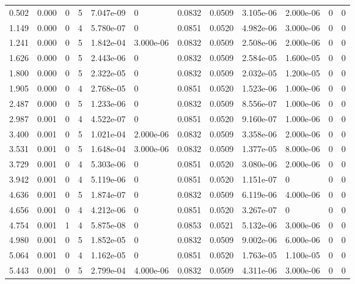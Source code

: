 \documentclass[preview]{standalone}
\begin{document}
{{\begin{tabular}{L{1.2cm}C{1.2cm} C{0.3cm}C{0.5cm} C{1.4cm}C{1.4cm} C{1.4cm}C{1.4cm} C{1.6cm}C{1.6cm} C{1.6cm}C{1.6cm}}
  0.502  &  0.000  & 0     &  5 &  7.047e-09  & 0  &  0.0832&   0.0509& 3.105e-06 & 2.000e-06   &  0 & 0  \\ 
  1.149  &  0.000  & 0     &  4 &  5.780e-07  & 0  &  0.0851&   0.0520& 4.982e-06 & 3.000e-06   &  0 & 0  \\ 
  1.241  &  0.000  & 0     &  5 &  1.842e-04  & 3.000e-06  &  0.0832&   0.0509& 2.508e-06 & 2.000e-06   &  0 & 0  \\ 
  1.626  &  0.000  & 0     &  5 &  2.443e-06  & 0  &  0.0832&   0.0509& 2.584e-05 & 1.600e-05   &  0 & 0  \\ 
  1.800  &  0.000  & 0     &  5 &  2.322e-05  & 0  &  0.0832&   0.0509& 2.032e-05 & 1.200e-05   &  0 & 0  \\ 
  1.905  &  0.000  & 0     &  4 &  2.768e-05  & 0  &  0.0851&   0.0520& 1.523e-06 & 1.000e-06   &  0 & 0  \\ 
  2.487  &  0.000  & 0     &  5 &  1.233e-06  & 0  &  0.0832&   0.0509& 8.556e-07 & 1.000e-06   &  0 & 0  \\ 
  2.987  &  0.001  & 0     &  4 &  4.522e-07  & 0  &  0.0851&   0.0520& 9.160e-07 & 1.000e-06   &  0 & 0  \\ 
  3.400  &  0.001  & 0     &  5 &  1.021e-04  & 2.000e-06  &  0.0832&   0.0509& 3.358e-06 & 2.000e-06   &  0 & 0  \\ 
  3.531  &  0.001  & 0     &  5 &  1.648e-04  & 3.000e-06  &  0.0832&   0.0509& 1.377e-05 & 8.000e-06   &  0 & 0  \\ 
  3.729  &  0.001  & 0     &  4 &  5.303e-06  & 0  &  0.0851&   0.0520& 3.080e-06 & 2.000e-06   &  0 & 0  \\ 
  3.942  &  0.001  & 0     &  4 &  5.119e-06  & 0  &  0.0851&   0.0520& 1.151e-07 & 0   &  0 & 0  \\ 
  4.636  &  0.001  & 0     &  5 &  1.874e-07  & 0  &  0.0832&   0.0509& 6.119e-06 & 4.000e-06   &  0 & 0  \\ 
  4.656  &  0.001  & 0     &  4 &  4.212e-06  & 0  &  0.0851&   0.0520& 3.267e-07 & 0   &  0 & 0  \\ 
  4.754  &  0.001  & 1     &  4 &  5.875e-08  & 0  &  0.0853&   0.0521& 5.132e-06 & 3.000e-06   &  0 & 0  \\ 
  4.980  &  0.001  & 0     &  5 &  1.852e-05  & 0  &  0.0832&   0.0509& 9.002e-06 & 6.000e-06   &  0 & 0  \\ 
  5.064  &  0.001  & 0     &  4 &  1.162e-05  & 0  &  0.0851&   0.0520& 1.763e-05 & 1.100e-05   &  0 & 0  \\ 
  5.443  &  0.001  & 0     &  5 &  2.799e-04  & 4.000e-06  &  0.0832&   0.0509& 4.311e-06 & 3.000e-06   &  0 & 0  \\ 

\end{tabular}}}
\end{document}
